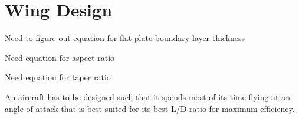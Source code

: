 



\section{Wing Design}
\begin{comment}
\end{comment}

Need to figure out equation for flat plate boundary layer thickness

Need equation for aspect ratio

Need equation for taper ratio

An aircraft has to be designed such that it spends most of its time flying at an angle of attack that is best suited for its best L/D ratio for maximum efficiency.


